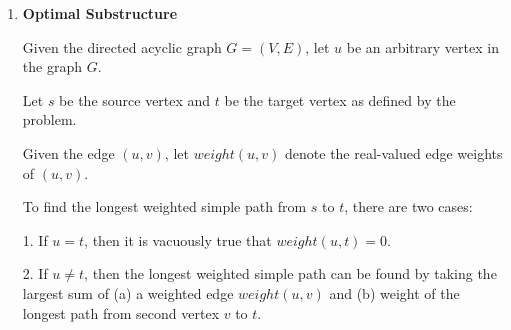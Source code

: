 \documentclass[a4paper]{report}
\begin{document}
\begin{enumerate}
      $end$ will be the last word of the line. 

      We initialize this algorithm with $printLines(trace, n)$ where $n$ is the last word.

      \begin{algorithmic}[1]
          \Comment Find the first word of the line
          \State $first = trace[end]$

          \Comment Base Case
            \State $line = 1$
          \Else
            \State $line = 1 + printLines(trace, first - 1)$
          \EndIf

          \State print $first, end, line$
          \State return $line$

        \EndFunction
      \end{algorithmic}


      {\it Time and Space Complexity:}

      This algorithm, in total, recursively calls printLines on at most every word. Thus, the time complexity is $O(n)$.

      $printInv$ does not add any additional space requirements because $trace$ and $end$ are already defined. Thus,
      the algorithm as a whole ($printInv$ and $computeWraps$) still takes $\Theta(M \cdot n)$ space. 



    
    \bigskip
    \setcounter{equation}{0}
    \item 
      {\bf Optimal Substructure}

      Given the directed acyclic graph $G = (V,E)$, let $u$ be an arbitrary vertex in the graph $G$.

      Let $s$ be the source vertex and $t$ be the target vertex as defined by the problem.

      Given the edge $(u,v)$, let $weight(u,v)$ denote the real-valued edge weights of $(u,v)$.

      To find the longest weighted simple path from $s$ to $t$, there are two cases:
      
      1. If $u = t$, then it is vacuously true that $weight(u,t) = 0$.

      2. If $u \neq t$, then the longest weighted simple path can be found by taking the largest sum of
      (a) a weighted edge $weight(u,v)$ and (b) weight of the longest path from second vertex $v$ to $t$.
      

\end{enumerate}
\end{document}

